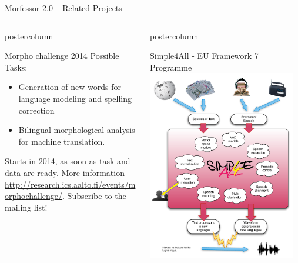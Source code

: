 \documentclass[final]{beamer} %
\begin{document}
\begin{frame}{Morfessor 2.0 -- Related Projects}
\begin{columns}
\begin{column}{.49\textwidth}
\begin{beamercolorbox}[center,wd=\textwidth]{postercolumn}
\begin{block}{Morpho challenge 2014}
	Possible Tasks:       \begin{itemize}
		\item Generation of new words for language modeling and spelling correction
\item Bilingual morphological analysis for machine translation.
              \end{itemize}  

Starts in 2014, as soon as task and data are ready. More information \url{http://research.ics.aalto.fi/events/morphochallenge/}. Subscribe to the mailing list!
            \end{block}
            
	\end{beamercolorbox}



\end{column}
\begin{column}{.45\textwidth}
  \begin{beamercolorbox}[center,wd=\textwidth]{postercolumn}
 \begin{block}{Simple4All - EU Framework 7 Programme}
\includegraphics[width=0.95\textwidth]{s4a}             
            \end{block}
            
	\end{beamercolorbox}
\end{column}

\end{columns}
 \end{frame}



  
\end{document}
